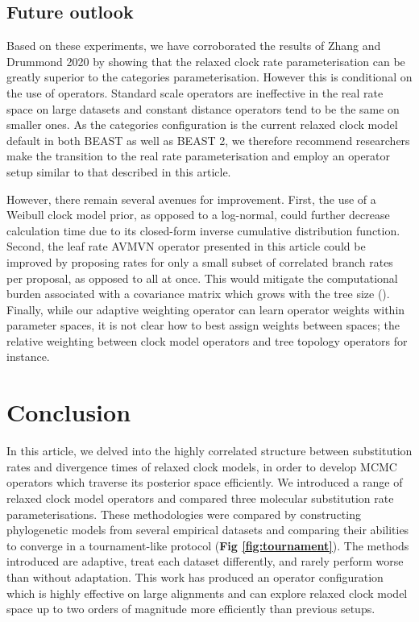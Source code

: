\documentclass[10pt,letterpaper]{article}
\begin{document}
\subsection*{Future outlook}

Based on these experiments, we have corroborated the results of Zhang and Drummond 2020 \cite{zhang2020improving} by showing that the relaxed clock rate parameterisation can be greatly superior to the categories parameterisation.
However this is conditional on the use of operators. 
Standard scale operators are ineffective in the real rate space on large datasets and constant distance operators tend to be the same on smaller ones.
As the categories configuration is the current relaxed clock model default in both BEAST as well as BEAST 2, we therefore recommend researchers make the transition to the real rate parameterisation and employ an operator setup similar to that described in this article.

However, there remain several avenues for improvement.
First, the use of a Weibull clock model prior, as opposed to a log-normal, could further decrease calculation time due to its closed-form inverse cumulative distribution function.
Second, the leaf rate AVMVN operator presented in this article could be improved by proposing rates for only a small subset of correlated branch rates per proposal, as opposed to all at once. 
This would mitigate the computational burden associated with a covariance matrix which grows with the tree size (\textbf{}).
Finally, while our adaptive weighting operator can learn operator weights within parameter spaces, it is not clear how to best assign weights between spaces; the relative weighting between clock model operators and tree topology operators for instance.




\newpage
\section*{Conclusion}

In this article, we delved into the highly correlated structure between substitution rates and divergence times of relaxed clock models, in order to develop MCMC operators which traverse its posterior space efficiently.
We introduced a range of relaxed clock model operators and compared three molecular substitution rate parameterisations.
These methodologies were compared by constructing phylogenetic models from several empirical datasets and comparing their abilities to converge in a tournament-like protocol (\textbf{Fig \ref{fig:tournament}}).
The methods introduced are adaptive, treat each dataset differently, and rarely perform worse than without adaptation. 
This work has produced an operator configuration which is highly effective  on large alignments and can explore relaxed clock model space up to two orders of magnitude more efficiently than previous setups.
\end{document}
